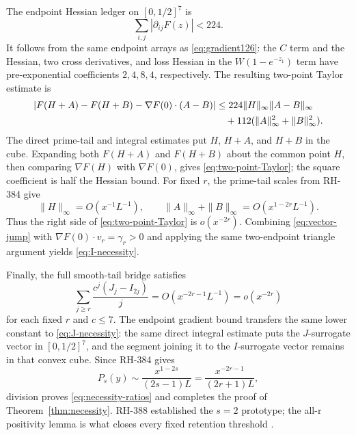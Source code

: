 \documentclass[11pt]{article}
\theoremstyle{definition}
\theoremstyle{remark}
\begin{document}
The endpoint Hessian ledger on $[0,1/2]^7$ is
\begin{equation}
 \sum_{i,j}|\partial_{ij}F(z)|<224.
 \label{eq:Hessian224}
\end{equation}
It follows from the same endpoint arrays as \eqref{eq:gradient126}: the
$C$ term and the Hessian, two cross derivatives, and loss Hessian in the
$W(1-e^{-z_1})$ term have pre-exponential coefficients
$2,4,8,4$, respectively.  The resulting two-point Taylor estimate is
\begin{align}
 |F(H+A)-F(H+B)-\nabla F(0)\mathbin{\cdot}(A-B)|
 &\le224\|H\|_\infty\|A-B\|_\infty\notag\\
 &\quad+112(\|A\|_\infty^2+\|B\|_\infty^2).
 \label{eq:two-point-Taylor}
\end{align}
The direct prime-tail and integral estimates put $H$, $H+A$, and $H+B$
in the cube.  Expanding both $F(H+A)$ and $F(H+B)$ about the common
point $H$, then comparing $\nabla F(H)$ with $\nabla F(0)$, gives
\eqref{eq:two-point-Taylor}; the square coefficient is half the Hessian
bound.
For fixed $r$, the prime-tail scales from RH-384 give
\begin{equation}
 \|H\|_\infty=O(x^{-1}L^{-1}),\qquad
 \|A\|_\infty+\|B\|_\infty=O(x^{1-2r}L^{-1}).
 \label{eq:head-tail-orders}
\end{equation}
Thus the right side of \eqref{eq:two-point-Taylor} is $o(x^{-2r})$.
Combining \eqref{eq:vector-jump} with
$\nabla F(0)\cdot v_r=\gamma_r>0$ and applying the same two-endpoint
triangle argument yields \eqref{eq:I-necessity}.

Finally, the full smooth-tail bridge satisfies
\begin{equation}
 \sum_{j\ge r}\frac{c^j(J_j-I_{2j})}{j}
 =O(x^{-2r-1}L^{-1})=o(x^{-2r})
 \label{eq:J-tail-bridge}
\end{equation}
for each fixed $r$ and $c\le7$.  The endpoint gradient bound transfers
the same lower constant to \eqref{eq:J-necessity}: the same direct
integral estimate puts the $J$-surrogate vector in $[0,1/2]^7$, and the
segment joining it to the $I$-surrogate vector remains in that convex
cube.  Since RH-384 gives
\begin{equation}
 P_s(y)\sim\frac{x^{1-2s}}{(2s-1)L}
 =\frac{x^{-2r-1}}{(2r+1)L},
 \label{eq:Ps-fixed-scale}
\end{equation}
division proves \eqref{eq:necessity-ratios} and completes the proof of
Theorem~\ref{thm:necessity}.  RH-388 established the $s=2$ prototype;
the all-r positivity lemma is what closes every fixed retention threshold
\cite{RH388}.
\end{document}
